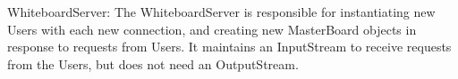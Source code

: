 WhiteboardServer: The WhiteboardServer is responsible for instantiating new Users with each new connection, and creating new MasterBoard objects in response to requests from Users. It maintains an InputStream to receive requests from the Users, but does not need an OutputStream.

